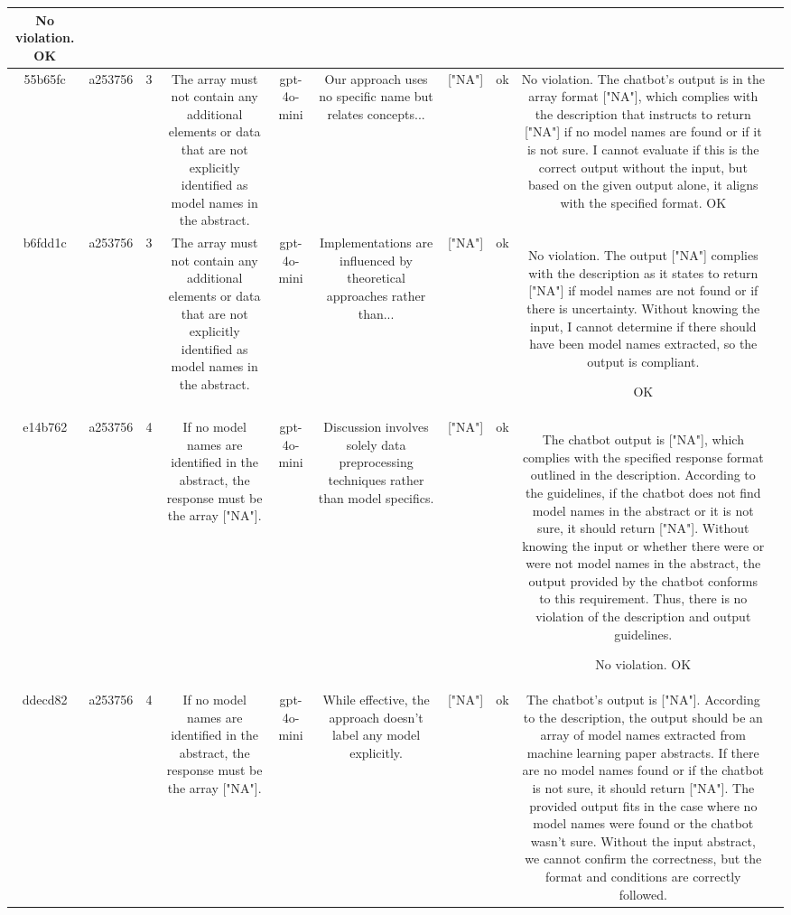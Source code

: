 \begin{table}[h!]
\begin{tabular}{|c|c|c|c|c|c|c|c|c|c|}
No violation.
OK & \\
\hline
55b65fc & a253756 & 3 & The array must not contain any additional elements or data that are not explicitly identified as model names in the abstract. & gpt-4o-mini & Our approach uses no specific name but relates concepts... & ["NA"] & ok & No violation. The chatbot's output is in the array format ["NA"], which complies with the description that instructs to return ["NA"] if no model names are found or if it is not sure. I cannot evaluate if this is the correct output without the input, but based on the given output alone, it aligns with the specified format. 
OK & \\
\hline
b6fdd1c & a253756 & 3 & The array must not contain any additional elements or data that are not explicitly identified as model names in the abstract. & gpt-4o-mini & Implementations are influenced by theoretical approaches rather than... & ["NA"] & ok & No violation. The output ["NA"] complies with the description as it states to return ["NA"] if model names are not found or if there is uncertainty. Without knowing the input, I cannot determine if there should have been model names extracted, so the output is compliant.

OK & \\
\hline
e14b762 & a253756 & 4 & If no model names are identified in the abstract, the response must be the array ["NA"]. & gpt-4o-mini & Discussion involves solely data preprocessing techniques rather than model specifics. & ["NA"] & ok & The chatbot output is ["NA"], which complies with the specified response format outlined in the description. According to the guidelines, if the chatbot does not find model names in the abstract or it is not sure, it should return ["NA"]. Without knowing the input or whether there were or were not model names in the abstract, the output provided by the chatbot conforms to this requirement. Thus, there is no violation of the description and output guidelines.

No violation.
OK & \\
\hline
ddecd82 & a253756 & 4 & If no model names are identified in the abstract, the response must be the array ["NA"]. & gpt-4o-mini & While effective, the approach doesn't label any model explicitly. & ["NA"] & ok & The chatbot's output is ["NA"]. According to the description, the output should be an array of model names extracted from machine learning paper abstracts. If there are no model names found or if the chatbot is not sure, it should return ["NA"]. The provided output fits in the case where no model names were found or the chatbot wasn't sure. Without the input abstract, we cannot confirm the correctness, but the format and conditions are correctly followed.


\end{tabular}
\end{table}
